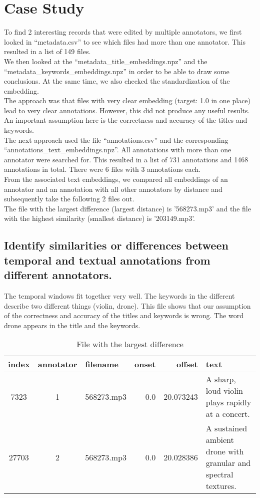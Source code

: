 
\section{Case Study}
\label{sec:Case Study}

To find 2 interesting records that were edited by multiple annotators, 
we first looked in ``metadata.csv'' to see which files had more than one annotator. 
This resulted in a list of 149 files. \\
We then looked at the ``metadata\_title\_embeddings.npz'' and the ``metadata\_keywords\_embeddings.npz'' in order 
to be able to draw some conclusions. 
At the same time, we also checked the standardization of the embedding. \\
The approach was that files with very clear embedding (target: 1.0 in one place) lead to very clear annotations. 
However, this did not produce any useful results. \\
An important assumption here is the correctness and accuracy of the titles and keywords. \\
The next approach used the file ``annotations.csv'' and the corresponding ``annotations\_text\_embeddings.npz''. 
All annotations with more than one annotator were searched for. 
This resulted in a list of 731 annotations and 1468 annotations in total. There were 6 files with 3 annotations each. \\
From the associated text embeddings, we compared all embeddings of an annotator and an annotation with all other annotators by distance and 
subsequently take the following 2 files out. \\
The file with the largest difference (largest distance) is '568273.mp3' and the file with the highest similarity (smallest distance) is '203149.mp3'.

\subsection{Identify similarities or differences between temporal and textual annotations from different annotators.}
\label{sec:Case Study:a}

The temporal windows fit together very well. The keywords in the different describe two different things (violin, drone).
This file shows that our assumption of the correctness and accuracy of the titles and keywords is wrong. 
The word drone appears in the title and the keywords.

\begin{table}[h]
  \caption{File with the largest difference}
  \label{tab:largest difference}
  \centering
  \begin{tabular}{cclrrp{6cm}}
    \toprule
    index & annotator & filename & onset & offset & text \\
    \midrule
    7323 & 1 & 568273.mp3 & 0.0 & 20.073243 & A sharp, loud violin plays rapidly at a concert. \\
    27703 & 2 & 568273.mp3 & 0.0 & 20.028386 & A sustained ambient drone with granular and spectral textures. \\
    \bottomrule
  \end{tabular}
\end{table}

